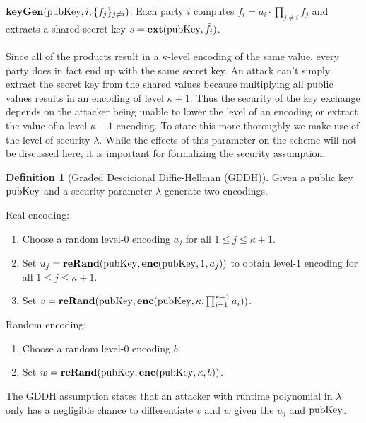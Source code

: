 \documentclass[english]{scrartcl}
\theoremstyle{plain}
\theoremstyle{definition}
\newtheorem{definition}{Definition}
\begin{document}
    $\mathbf{keyGen}(\mathrm{pubKey}, i, \{ f_j \}_{j \neq i})$: Each party $i$ computes $\bar{f}_i = a_i \cdot \prod_{j \neq i} f_j$ and extracts a shared secret key $s = \mathbf{ext}(\mathrm{pubKey}, \bar{f}_i)$.
    \\\\
    Since all of the products result in a $\kappa$-level encoding of the same value, every party does in fact end up with the same secret key. An attack can't simply extract the secret key from the shared values because multiplying all public values results in an encoding of level $\kappa + 1$.
    Thus the security of the key exchange depends on the attacker being unable to lower the level of an encoding or extract the value of a level-$\kappa + 1$ encoding. To state this more thoroughly we make use of the level of security $\lambda$. While the effects of this parameter on the scheme will not be discussed here, it is important for formalizing the security assumption.

    \begin{definition}[Graded Descicional Diffie-Hellman (GDDH)]
        Given a public key $\mathrm{pubKey}$ and a security parameter $\lambda$ generate two encodings.

        Real encoding:
        \begin{enumerate}
            \item Choose a random level-0 encoding $a_j$ for all $1 \leq j \leq \kappa + 1$.
            \item Set $u_j = \mathbf{reRand}(\mathrm{pubKey}, \mathbf{enc}(\mathrm{pubKey}, 1, a_j))$ to obtain level-1 encoding for all $1 \leq j \leq \kappa + 1$.
            \item Set $v = \mathbf{reRand}(\mathrm{pubKey}, \mathbf{enc}(\mathrm{pubKey}, \kappa, \prod_{i=1}^{\kappa + 1} a_i))$.
        \end{enumerate}

        Random encoding:
        \begin{enumerate}
            \item Choose a random level-0 encoding $b$.
            \item Set $w = \mathbf{reRand}(\mathrm{pubKey}, \mathbf{enc}(\mathrm{pubKey}, \kappa, b))$.
        \end{enumerate}

        The GDDH assumption states that an attacker with runtime polynomial in $\lambda$ only has a negligible chance to differentiate $v$ and $w$ given the $u_j$ and $\mathrm{pubKey}$.\cite{cryptoeprint:2013:183}
    \end{definition}
\end{document}
